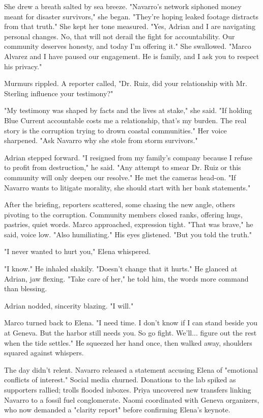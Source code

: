 She drew a breath salted by sea breeze. "Navarro's network siphoned money meant for disaster survivors," she began. "They're hoping leaked footage distracts from that truth." She kept her tone measured. "Yes, Adrian and I are navigating personal changes. No, that will not derail the fight for accountability. Our community deserves honesty, and today I'm offering it." She swallowed. "Marco Alvarez and I have paused our engagement. He is family, and I ask you to respect his privacy."

Murmurs rippled. A reporter called, "Dr. Ruiz, did your relationship with Mr. Sterling influence your testimony?"

"My testimony was shaped by facts and the lives at stake," she said. "If holding Blue Current accountable costs me a relationship, that's my burden. The real story is the corruption trying to drown coastal communities." Her voice sharpened. "Ask Navarro why she stole from storm survivors."

Adrian stepped forward. "I resigned from my family's company because I refuse to profit from destruction," he said. "Any attempt to smear Dr. Ruiz or this community will only deepen our resolve." He met the cameras head-on. "If Navarro wants to litigate morality, she should start with her bank statements."

After the briefing, reporters scattered, some chasing the new angle, others pivoting to the corruption. Community members closed ranks, offering hugs, pastries, quiet words. Marco approached, expression tight. "That was brave," he said, voice low. "Also humiliating." His eyes glistened. "But you told the truth."

"I never wanted to hurt you," Elena whispered.

"I know." He inhaled shakily. "Doesn't change that it hurts." He glanced at Adrian, jaw flexing. "Take care of her," he told him, the words more command than blessing.

Adrian nodded, sincerity blazing. "I will."

Marco turned back to Elena. "I need time. I don't know if I can stand beside you at Geneva. But the harbor still needs you. So go fight. We'll... figure out the rest when the tide settles." He squeezed her hand once, then walked away, shoulders squared against whispers.

The day didn't relent. Navarro released a statement accusing Elena of "emotional conflicts of interest." Social media churned. Donations to the lab spiked as supporters rallied; trolls flooded inboxes. Priya uncovered new transfers linking Navarro to a fossil fuel conglomerate. Naomi coordinated with Geneva organizers, who now demanded a "clarity report" before confirming Elena's keynote.


